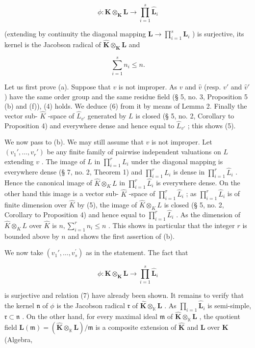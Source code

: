 \[
\phi : \hat {\mathbf {K}} \otimes_ {\mathbf {K}} \mathbf {L} \rightarrow \prod_ {i = 1} ^ {s} \hat {\mathbf {L}} _ {i}
\]

(extending by continuity the diagonal mapping \(\mathbf{L} \to \prod_{i=1}^{s} \mathbf{L}_i\) ) is surjective, its kernel is the Jacobson radical of \(\hat{\mathbf{K}} \otimes_{\mathbf{K}} \mathbf{L}\) and

\[
\sum_ {i = 1} ^ {s} n _ {i} \leqslant n.\tag{7}
\]

Let us first prove (a). Suppose that \(v\) is not improper. As \(v\) and \(\hat{v}\) (resp. \(v'\) and \(\hat{v}'\) ) have the same order group and the same residue field (§ 5, no. 3, Proposition 5 (b) and (f)), (4) holds. We deduce (6) from it by means of Lemma 2. Finally the vector sub- \(\hat{K}\) -space of \(\hat{L}_{v'}\) generated by \(L\) is closed (§ 5, no. 2, Corollary to Proposition 4) and everywhere dense and hence equal to \(\hat{L}_{v'}\) ; this shows (5).

We now pass to (b). We may still assume that \(v\) is not improper. Let \((v_1', \ldots, v_r')\) be any finite family of pairwise independent valuations on \(L\) extending \(v\) . The image of \(L\) in \(\prod_{i=1}^{r} L_i\) under the diagonal mapping is everywhere dense (§ 7, no. 2, Theorem 1) and \(\prod_{i=1}^{r} L_i\) is dense in \(\prod_{i=1}^{r} \hat{L}_i\) . Hence the canonical image of \(\hat{K} \otimes_K L\) in \(\prod_{i=1}^{r} \hat{L}_i\) is everywhere dense. On the other hand this image is a vector sub- \(\hat{K}\) -space of \(\prod_{i=1}^{r} \hat{L}_i\) ; as \(\prod_{i=1}^{r} \hat{L}_i\) is of finite dimension over \(\hat{K}\) by (5), the image of \(\hat{K} \otimes_K L\) is closed (§ 5, no. 2, Corollary to Proposition 4) and hence equal to \(\prod_{i=1}^{r} \hat{L}_i\) . As the dimension of \(\hat{K} \otimes_K L\) over \(\hat{K}\) is \(n, \sum_{i=1}^{r} n_i \leqslant n\) . This shows in particular that the integer \(r\) is bounded above by \(n\) and shows the first assertion of (b).

We now take \((v_{1}',\ldots ,v_{s}^{\prime})\) as in the statement. The fact that

\[
\phi : \hat {\mathbf {K}} \otimes_ {\mathbf {K}} \mathbf {L} \rightarrow \prod_ {i = 1} ^ {s} \hat {\mathbf {L}} _ {i}
\]

is surjective and relation (7) have already been shown. It remains to verify that the kernel \(\mathfrak{n}\) of \(\phi\) is the Jacobson radical \(\mathfrak{r}\) of \(\hat{\mathbf{K}}\otimes_{\mathbb{K}}\mathbf{L}\) . As \(\prod_{i = 1}\hat{\mathbf{L}}_i\) is semi-simple, \(\mathfrak{r}\subset \mathfrak{n}\) . On the other hand, for every maximal ideal \(\mathfrak{m}\) of \(\hat{\mathbf{K}}\otimes_{\mathbb{K}}\mathbf{L}\) , the quotient field \(\mathbf{L}(\mathfrak{m}) = (\hat{\mathbf{K}}\otimes_{\mathbb{K}}\mathbf{L}) / \mathfrak{m}\) is a composite extension of \(\hat{\mathbf{K}}\) and \(\mathbf{L}\) over \(\mathbf{K}\) (Algebra,

